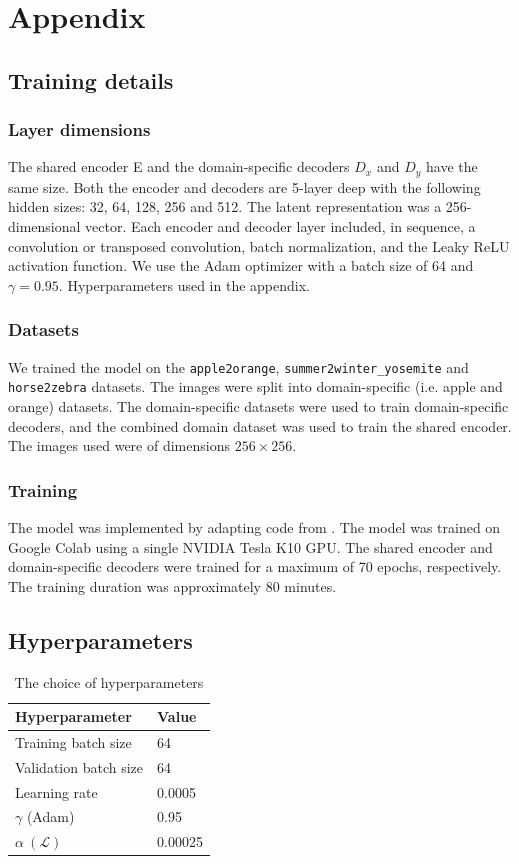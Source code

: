 \documentclass{article}
\begin{document}
\newpage
\appendix
\section*{Appendix}
\renewcommand{\thesubsection}{\Alph{subsection}}
\subsection{Training details}
\subsubsection{Layer dimensions}
The shared encoder E and the domain-specific decoders $D_x$ and $D_y$ have the same size. Both the encoder and decoders are 5-layer deep with the following hidden sizes: 32, 64, 128, 256 and 512. The latent representation was a 256-dimensional vector. Each encoder and decoder layer included, in sequence, a convolution or transposed convolution, batch normalization, and the Leaky ReLU activation function. We use the Adam optimizer with a batch size of 64 and $\gamma = 0.95$. Hyperparameters used in the appendix.

\subsubsection{Datasets}
We trained the model on the \texttt{apple2orange}, \texttt{summer2winter\_yosemite} and \texttt{horse2zebra} datasets. The images were split into domain-specific (i.e. apple and orange) datasets. The domain-specific datasets were used to train domain-specific decoders, and the combined domain dataset was used to train the shared encoder. The images used were of dimensions $256\times256$.
\subsubsection{Training}
The model was implemented by adapting code from \citet{subramanian}. The model was trained on Google Colab using a single NVIDIA Tesla K10 GPU. The shared encoder and domain-specific decoders were trained for a maximum of 70 epochs, respectively. The training duration was approximately 80 minutes.
\subsection{Hyperparameters}
\begin{table}[H]
  \caption{The choice of hyperparameters}
  \label{sample-table}
  \centering
  \begin{tabular}{ll}
    \toprule
    Hyperparameter     & Value\\
    \midrule
    Training batch size & 64\\
    Validation batch size & 64\\
    Learning rate & 0.0005\\
    $\gamma$ (Adam) & 0.95\\
    $\alpha\ (\mathcal{L})$ & 0.00025\\
    \bottomrule
  \end{tabular}
  \label{tab:hyperparams}
\end{table}
\end{document}
